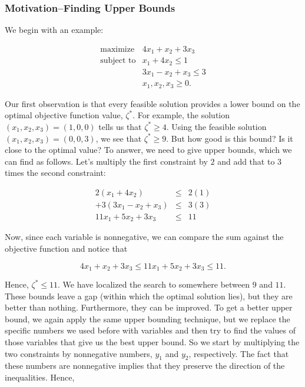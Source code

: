 \documentclass{article}
\begin{document}
\subsubsection{Motivation--Finding Upper Bounds}

We begin with an example:

\[
\begin{array}{ll}
\text{maximize} & 4x_{1} + x_{2} + 3x_{3} \\
\text{subject to} & x_{1} + 4x_{2} \leq 1 \\
& 3x_{1} - x_{2} + x_{3} \leq 3 \\
& x_{1}, x_{2}, x_{3} \geq 0.
\end{array}
\]

Our first observation is that every feasible solution provides a lower bound on the optimal objective function value, $\zeta^{*}$. For example, the solution $(x_{1},x_{2},x_{3})=(1,0,0)$ tells us that $\zeta^{*} \geq 4$. Using the feasible solution $(x_{1},x_{2},x_{3})=(0,0,3)$, we see that $\zeta^{*} \geq 9$. But how good is this bound? Is it close to the optimal value? To answer, we need to give upper bounds, which we can find as follows. Let's multiply the first constraint by $2$ and add that to $3$ times the second constraint:

\[
\begin{array}{rcl}
2(x_{1} + 4x_{2}) & \leq & 2(1) \\
+ 3(3x_{1} - x_{2} + x_{3}) & \leq & 3(3) \\
\hline
11x_{1} + 5x_{2} + 3x_{3} & \leq & 11
\end{array}
\]

Now, since each variable is nonnegative, we can compare the sum against the objective function and notice that

\[
4x_{1} + x_{2} + 3x_{3} \leq 11x_{1} + 5x_{2} + 3x_{3} \leq 11.
\]

Hence, $\zeta^{*} \leq 11$. We have localized the search to somewhere between $9$ and $11$. These bounds leave a gap (within which the optimal solution lies), but they are better than nothing. Furthermore, they can be improved. To get a better upper bound, we again apply the same upper bounding technique, but we replace the specific numbers we used before with variables and then try to find the values of those variables that give us the best upper bound. So we start by multiplying the two constraints by nonnegative numbers, $y_{1}$ and $y_{2}$, respectively. The fact that these numbers are nonnegative implies that they preserve the direction of the inequalities. Hence,
\end{document}
